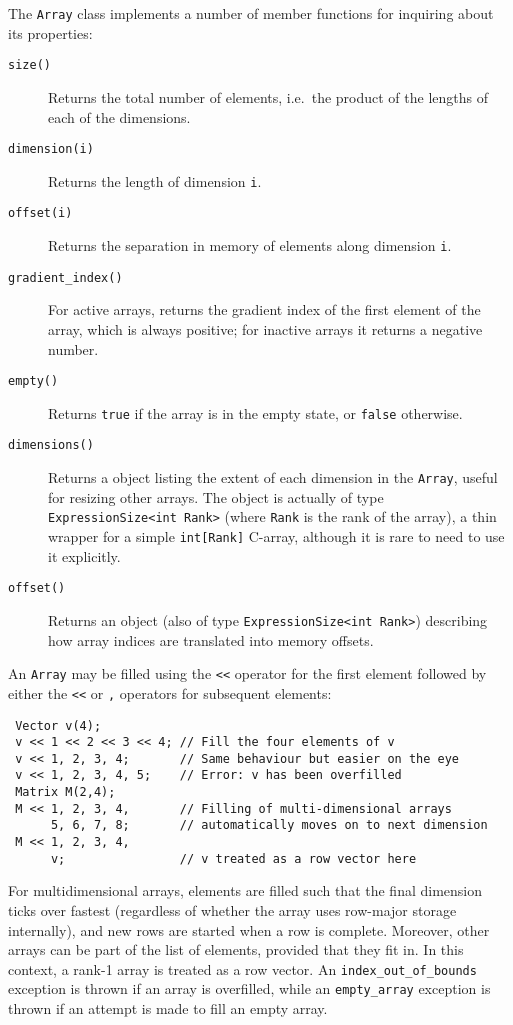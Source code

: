 \documentclass[a4,oneside]{book}
\def\codesize{\small}
\def\code#1{{\codesize\texttt{#1}}}
\def\citem#1{\item[{\codesize\texttt{#1}}]}
\begin{document}
The \code{Array} class implements a number of member functions for
inquiring about its properties:
\begin{description}
\citem{size()} Returns the total number of elements, i.e.\ the product
of the lengths of each of the dimensions.
\citem{dimension(i)} Returns the length of dimension \code{i}.
\citem{offset(i)} Returns the separation in memory of elements along
dimension \code{i}.
\citem{gradient\_index()} For active arrays, returns the gradient
index of the first element of the array, which is always positive; for
inactive arrays it returns a negative number.
\citem{empty()} Returns \code{true} if the array is in the empty
state, or \code{false} otherwise.
\citem{dimensions()} Returns a object listing the extent of each
dimension in the \code{Array}, useful for resizing other arrays.  The
object is actually of type \code{ExpressionSize<int Rank>} (where
\code{Rank} is the rank of the array), a thin wrapper for a simple
  \code{int[Rank]} C-array, although it is rare to need to use it
  explicitly.
\citem{offset()} Returns an object (also of type
\code{ExpressionSize<int Rank>}) describing how array indices are
translated into memory offsets.
\end{description}

An \code{Array} may be filled using the \code{<<} operator for the
first element followed by either the \code{<<} or \code{,} operators
for subsequent elements:
\begin{lstlisting}
 Vector v(4);
 v << 1 << 2 << 3 << 4; // Fill the four elements of v
 v << 1, 2, 3, 4;       // Same behaviour but easier on the eye
 v << 1, 2, 3, 4, 5;    // Error: v has been overfilled
 Matrix M(2,4);
 M << 1, 2, 3, 4,       // Filling of multi-dimensional arrays
      5, 6, 7, 8;       // automatically moves on to next dimension
 M << 1, 2, 3, 4,
      v;                // v treated as a row vector here
\end{lstlisting}
For multidimensional arrays, elements are filled such that the final
dimension ticks over fastest (regardless of whether the array uses
row-major storage internally), and new rows are started when a row is
complete. Moreover, other arrays can be part of the list of elements,
provided that they fit in.  In this context, a rank-1 array is treated
as a row vector. An \code{index\_out\_of\_bounds} exception is thrown
if an array is overfilled, while an \code{empty\_array} exception is
thrown if an attempt is made to fill an empty array.
\end{document}
